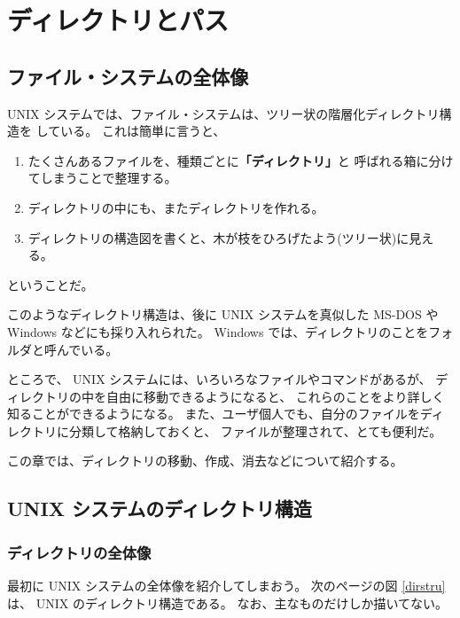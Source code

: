 \chapter{ディレクトリとパス}

\section*{ファイル・システムの全体像}

 UNIX システムでは、ファイル・システムは、ツリー状の階層化ディレクトリ構造を
している。
これは簡単に言うと、
\begin{enumerate}
\item たくさんあるファイルを、種類ごとに\textbf{「ディレクトリ」}と
呼ばれる箱に分けてしまうことで整理する。
\item ディレクトリの中にも、またディレクトリを作れる。
\item ディレクトリの構造図を書くと、木が枝をひろげたよう(ツリー状)に見える。
\end{enumerate}
ということだ。

このようなディレクトリ構造は、後に UNIX システムを真似した MS-DOS や
 Windows などにも採り入れられた。
 Windows では、ディレクトリのことをフォルダと呼んでいる。

\bigskip

ところで、 UNIX システムには、いろいろなファイルやコマンドがあるが、
ディレクトリの中を自由に移動できるようになると、
これらのことをより詳しく知ることができるようになる。
また、ユーザ個人でも、自分のファイルをディレクトリに分類して格納しておくと、
ファイルが整理されて、とても便利だ。

この章では、ディレクトリの移動、作成、消去などについて紹介する。

\section{UNIX システムのディレクトリ構造}

\subsection{ディレクトリの全体像}

最初に UNIX システムの全体像を紹介してしまおう。
次のページの図 \ref{dirstru} は、 UNIX のディレクトリ構造である。
なお、主なものだけしか描いてない。

